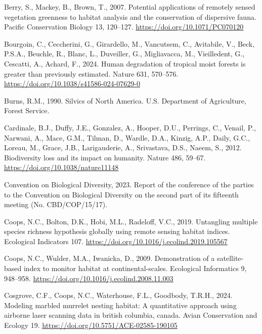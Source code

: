 \documentclass[
]{agujournal2019}
\newlength{\cslhangindent}
\newenvironment{CSLReferences}[2] %
 {\begin{list}{}{%
  \setlength{\itemindent}{0pt}
  \setlength{\leftmargin}{0pt}
  \setlength{\parsep}{0pt}
  \ifodd #1
   \setlength{\leftmargin}{\cslhangindent}
   \setlength{\itemindent}{-1\cslhangindent}
  \fi
  \setlength{\itemsep}{#2\baselineskip}}}
 {\end{list}}
\begin{document}
\begin{CSLReferences}{1}{0}
Berry, S., Mackey, B., Brown, T., 2007. Potential applications of
remotely sensed vegetation greenness to habitat analysis and the
conservation of dispersive fauna. Pacific Conservation Biology 13,
120--127. \url{https://doi.org/10.1071/PC070120}

Bourgoin, C., Ceccherini, G., Girardello, M., Vancutsem, C., Avitabile,
V., Beck, P.S.A., Beuchle, R., Blanc, L., Duveiller, G., Migliavacca,
M., Vieilledent, G., Cescatti, A., Achard, F., 2024. Human degradation
of tropical moist forests is greater than previously estimated. Nature
631, 570--576. \url{https://doi.org/10.1038/s41586-024-07629-0}

Burns, R.M., 1990. Silvics of North America. U.S. Department of
Agriculture, Forest Service.

Cardinale, B.J., Duffy, J.E., Gonzalez, A., Hooper, D.U., Perrings, C.,
Venail, P., Narwani, A., Mace, G.M., Tilman, D., Wardle, D.A., Kinzig,
A.P., Daily, G.C., Loreau, M., Grace, J.B., Larigauderie, A.,
Srivastava, D.S., Naeem, S., 2012. Biodiversity loss and its impact on
humanity. Nature 486, 59--67. \url{https://doi.org/10.1038/nature11148}

Convention on Biological Diversity, 2023. Report of the conference of
the parties to the {Convention} on {Biological Diversity} on the second
part of its fifteenth meeting (No. CBD/COP/15/17).

Coops, N.C., Bolton, D.K., Hobi, M.L., Radeloff, V.C., 2019. Untangling
multiple species richness hypothesis globally using remote sensing
habitat indices. Ecological Indicators 107.
\url{https://doi.org/10.1016/j.ecolind.2019.105567}

Coops, N.C., Wulder, M.A., Iwanicka, D., 2009. Demonstration of a
satellite-based index to monitor habitat at continental-scales.
Ecological Informatics 9, 948--958.
\url{https://doi.org/10.1016/j.ecolind.2008.11.003}

Cosgrove, C.F., Coops, N.C., Waterhouse, F.L., Goodbody, T.R.H., 2024.
Modeling marbled murrelet nesting habitat: A quantitative approach using
airborne laser scanning data in british columbia, canada. Avian
Conservation and Ecology 19.
\url{https://doi.org/10.5751/ACE-02585-190105}


\end{CSLReferences}
\end{document}

